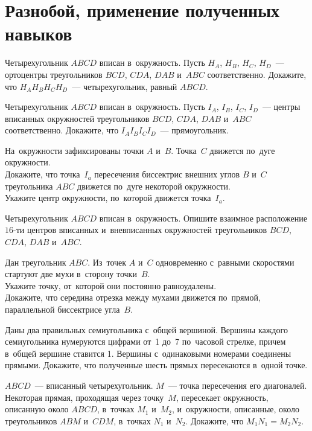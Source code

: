 
\section*{Разнобой, применение полученных навыков}


\begin{problems}

\item
Четырехугольник $ABCD$ вписан в~окружность.
Пусть $H_A$, $H_B$, $H_C$, $H_D$~--- ортоцентры треугольников
$BCD$, $CDA$, $DAB$ и~$ABC$ соответственно.
Докажите, что $H_A H_B H_C H_D$~--- четырехугольник, равный $ABCD$.

\item
Четырехугольник $ABCD$ вписан в~окружность.
Пусть $I_A$, $I_B$, $I_C$, $I_D$~--- центры вписанных окружностей
треугольников $BCD$, $CDA$, $DAB$ и~$ABC$ соответственно.
Докажите, что $I_A I_B I_C I_D$~--- прямоугольник.

\item
На~окружности зафиксированы точки $A$ и~$B$.
Точка~$C$ движется по~дуге окружности.
\\
\subproblem
Докажите, что точка~$I_a$ пересечения биссектрис внешних углов $B$ и~$C$
треугольника $ABC$ движется по~дуге некоторой окружности.
\\
\subproblem
Укажите центр окружности, по~которой движется точка~$I_a$.

\item
Четырехугольник $ABCD$ вписан в~окружность.
Опишите взаимное расположение $16$-ти центров вписанных и~вневписанных
окружностей треугольников $BCD$, $CDA$, $DAB$ и~$ABC$.

\item
Дан треугольник $ABC$.
Из~точек $A$ и~$C$ одновременно с~равными скоростями стартуют две мухи
в~сторону точки~$B$.
\\
\subproblem
Укажите точку, от~которой они постоянно равноудалены.
\\
\subproblem
Докажите, что середина отрезка между мухами движется по~прямой, параллельной
биссектрисе угла~$B$.

\item
Даны два правильных семиугольника с~общей вершиной.
Вершины каждого семиугольника нумеруются цифрами от~1 до~7 по~часовой
стрелке, причем в~общей вершине ставится 1.
Вершины с~одинаковыми номерами соединены прямыми.
Докажите, что полученные шесть прямых пересекаются в~одной точке.

\item
$ABCD$~--- вписанный четырехугольник.
$M$~--- точка пересечения его диагоналей.
Некоторая прямая, проходящая через точку~$M$, пересекает окружность, описанную
около $ABCD$, в~точках $M_1$ и~$M_2$, и~окружности, описанные, около
треугольников $ABM$ и~$CDM$, в~точках $N_1$ и~$N_2$.
Докажите, что $M_1 N_1 = M_2 N_2$.

\end{problems}

